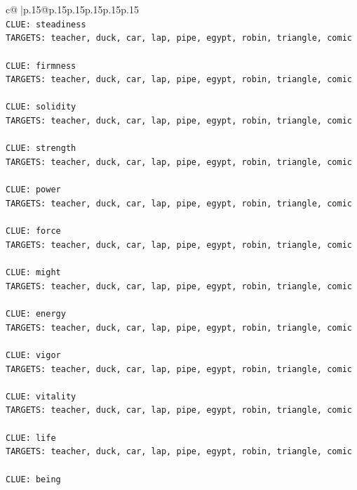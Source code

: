 \documentclass{article}
\begin{document}
{\begin{supertabular}{c@{$\;$}|p{.15\linewidth}@{}p{.15\linewidth}p{.15\linewidth}p{.15\linewidth}p{.15\linewidth}p{.15\linewidth}}
{{{\\ 
\texttt{CLUE: steadiness} \\
\texttt{TARGETS: teacher, duck, car, lap, pipe, egypt, robin, triangle, comic} \\
\\ 
\texttt{CLUE: firmness} \\
\texttt{TARGETS: teacher, duck, car, lap, pipe, egypt, robin, triangle, comic} \\
\\ 
\texttt{CLUE: solidity} \\
\texttt{TARGETS: teacher, duck, car, lap, pipe, egypt, robin, triangle, comic} \\
\\ 
\texttt{CLUE: strength} \\
\texttt{TARGETS: teacher, duck, car, lap, pipe, egypt, robin, triangle, comic} \\
\\ 
\texttt{CLUE: power} \\
\texttt{TARGETS: teacher, duck, car, lap, pipe, egypt, robin, triangle, comic} \\
\\ 
\texttt{CLUE: force} \\
\texttt{TARGETS: teacher, duck, car, lap, pipe, egypt, robin, triangle, comic} \\
\\ 
\texttt{CLUE: might} \\
\texttt{TARGETS: teacher, duck, car, lap, pipe, egypt, robin, triangle, comic} \\
\\ 
\texttt{CLUE: energy} \\
\texttt{TARGETS: teacher, duck, car, lap, pipe, egypt, robin, triangle, comic} \\
\\ 
\texttt{CLUE: vigor} \\
\texttt{TARGETS: teacher, duck, car, lap, pipe, egypt, robin, triangle, comic} \\
\\ 
\texttt{CLUE: vitality} \\
\texttt{TARGETS: teacher, duck, car, lap, pipe, egypt, robin, triangle, comic} \\
\\ 
\texttt{CLUE: life} \\
\texttt{TARGETS: teacher, duck, car, lap, pipe, egypt, robin, triangle, comic} \\
\\ 
\texttt{CLUE: being} \\
}}}
\end{supertabular}}
\end{document}
